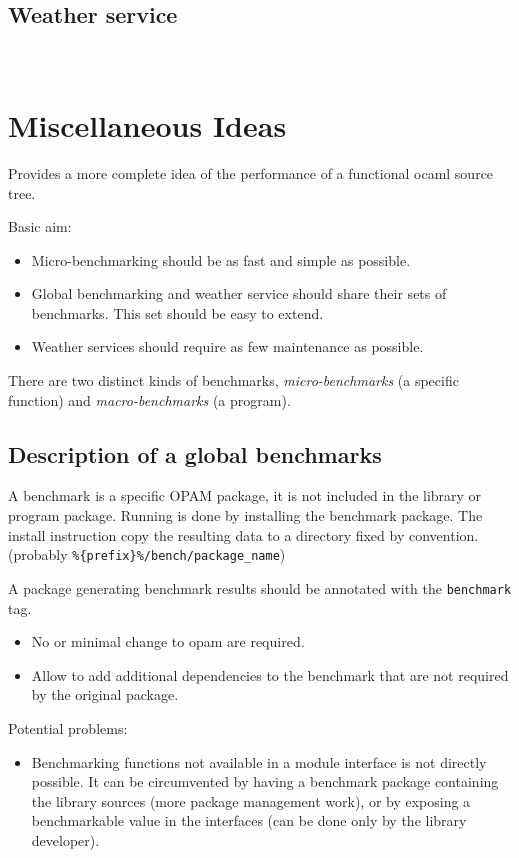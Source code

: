 \documentclass[11pt,a4paper]{article}
\begin{document}
\subsection{Weather service}
~\vspace{4cm}~

\section{Miscellaneous Ideas}

Provides a more complete idea of the performance of a functional
ocaml source tree.

Basic aim:
\begin{itemize}
\item Micro-benchmarking should be as fast and simple as possible.
\item Global benchmarking and weather service should share their sets
  of benchmarks. This set should be easy to extend.
\item Weather services should require as few maintenance as possible.
\end{itemize}

There are two distinct kinds of benchmarks, \emph{micro-benchmarks} (a specific
function) and \emph{macro-benchmarks} (a program).

\subsection{Description of a global benchmarks}

A benchmark is a specific OPAM package, it is not included in the
library or program package. Running is done by installing the
benchmark package. The install instruction copy the resulting data to
a directory fixed by convention. (probably
\texttt{\%\{prefix\}\%/bench/package\_name})

A package generating benchmark results should be annotated with the
\texttt{benchmark} tag.

\begin{itemize}
\item No or minimal change to opam are required.
\item Allow to add additional dependencies to the benchmark that are
  not required by the original package.
\end{itemize}

Potential problems:
\begin{itemize}
\item Benchmarking functions not available in a module interface is
  not directly possible. It can be circumvented by having a benchmark
  package containing the library sources (more package management
  work), or by exposing a benchmarkable value in the interfaces (can
  be done only by the library developer).
\end{itemize}
\end{document}
